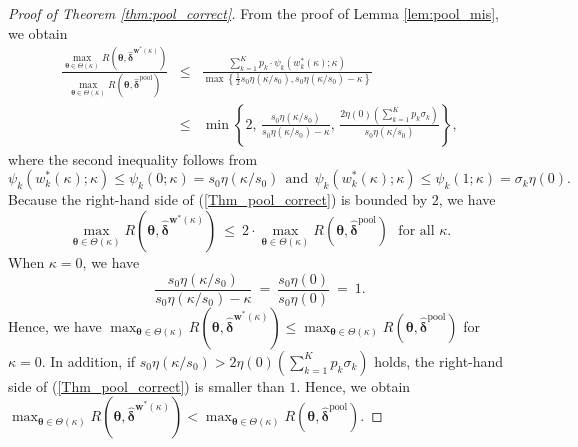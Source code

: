 \documentclass[12pt,a4paper]{article}
\begin{document}
\begin{proof}[Proof of Theorem \ref{thm:pool_correct}]
From the proof of Lemma \ref{lem:pool_mis}, we obtain
\begin{eqnarray}
\frac{\max_{\bm{\theta} \in \Theta(\kappa)} R(\bm{\theta},\hat{\bm{\delta}}^{\bm{w}^{\ast}(\kappa)})}{\max_{\bm{\theta} \in \Theta(\kappa)} R(\bm{\theta},\hat{\bm{\delta}}^{\mathrm{pool}})} & \leq & \frac{\sum_{k=1}^K p_k \cdot \psi_k\left( w_k^{\ast}(\kappa) ;\kappa \right)}{\max \left\{ \frac{1}{2} s_0 \eta ( \kappa / s_0 ), s_0 \eta ( \kappa / s_0 ) - \kappa \right\}} \nonumber \\
& \leq & \min \left\{ 2, \, \frac{s_0 \eta(\kappa / s_0)}{s_0 \eta(\kappa / s_0) - \kappa}, \, \frac{2\eta(0) \left( \sum_{k=1}^K p_k \sigma_k \right)}{s_0 \eta(\kappa / s_0)} \right\}, \label{Thm_pool_correct}
\end{eqnarray}
where the second inequality follows from 
\[
\psi_k\left( w_k^{\ast}(\kappa) ;\kappa \right) \leq \psi_k\left(0 ;\kappa \right) = s_0 \eta(\kappa / s_0) \ \ \text{and} \ \ \psi_k\left( w_k^{\ast}(\kappa) ;\kappa \right) \leq \psi_k\left(1 ;\kappa \right) = \sigma_k \eta(0).
\]
Because the right-hand side of (\ref{Thm_pool_correct}) is bounded by $2$, we have
\[
\max_{\bm{\theta} \in \Theta(\kappa)} R(\bm{\theta},\hat{\bm{\delta}}^{\bm{w}^{\ast}(\kappa)}) \ \leq \ 2 \cdot \max_{\bm{\theta} \in \Theta(\kappa)} R(\bm{\theta},\hat{\bm{\delta}}^{\mathrm{pool}}) \ \ \ \text{for all $\kappa$}.
\]
When $\kappa = 0$, we have
\[
\frac{s_0 \eta(\kappa / s_0)}{s_0 \eta(\kappa / s_0) - \kappa} \ = \ \frac{s_0 \eta(0)}{s_0 \eta(0)} \ = \ 1.
\]
Hence, we have $\max_{\bm{\theta} \in \Theta(\kappa)} R(\bm{\theta},\hat{\bm{\delta}}^{\bm{w}^{\ast}(\kappa)}) \leq \max_{\bm{\theta} \in \Theta(\kappa)} R(\bm{\theta},\hat{\bm{\delta}}^{\mathrm{pool}})$ for $\kappa=0$. In addition, if $s_0 \eta(\kappa/s_0) > 2\eta(0) \left( \sum_{k=1}^K p_k \sigma_k \right)$ holds, the right-hand side of (\ref{Thm_pool_correct}) is smaller than $1$. Hence, we obtain $\max_{\bm{\theta} \in \Theta(\kappa)} R(\bm{\theta},\hat{\bm{\delta}}^{\bm{w}^{\ast}(\kappa)}) < \max_{\bm{\theta} \in \Theta(\kappa)} R(\bm{\theta},\hat{\bm{\delta}}^{\mathrm{pool}})$.
\end{proof}\vspace{0.1in}
\end{document}
